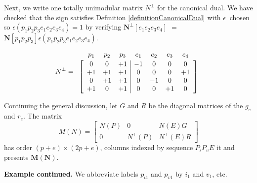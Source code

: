 \documentclass[12pt]{article}
\theoremstyle{definition}
\newcommand{\epsilonfun}{\ensuremath{\epsilon}}
\newcommand{\Is}{\ensuremath{\iota}}
\newcommand{\Vs}{\ensuremath{\upsilon}}
\newcommand{\ext}[1]{\ensuremath{\mathbf{#1}}}
\begin{document}
Next, we write one totally unimodular 
matrix $N^\perp$ for the canonical
dual.  We have checked that the sign satisfies Definition 
\ref{definitionCanonicalDual} with
$\epsilonfun\ $ chosen so $\epsilon(p_1p_2p_3e_1e_2e_3e_4)=1$
by verifying 
$\ext{N}^\perp[e_1e_2e_3e_4]$ 
$=$
$\ext{N}[p_1p_2p_3]\epsilon(p_1p_2p_3e_1e_2e_3e_4)$.



\[
N^\perp=
\begin{array}{c}
\begin{array}{ccccccc}
p_1 & p_2 & p_3 & e_1 & e_2 & e_3 & e_4 \\[-1em]
\hphantom{+1} & \hphantom{+1} &\hphantom{+1} &\hphantom{+1} &\hphantom{+1} &\hphantom{+1} &\hphantom{+1} 
\end{array} \\ 
\left[\begin{array}{ccc|cccc}
  0 &  0  &  +1 &  -1 &   0 &  0  & 0 \\
 +1 &  +1 &  +1 &   0 &   0 &  0  & +1\\
  0 &  +1 &  +1 &   0 &  -1 &  0  &  0\\
 +1 &   0 &  +1 &   0 &   0 & +1  &  0
	\end{array}\right]
  \end{array}
\]

Continuing the general discussion, let 
$G$ and $R$ be the diagonal matrices of the $g_e$ and $r_e$.
The matrix
\begin{equation}
\label{matrixM}
M(N)
=
\left[
	\begin{array}{ccc}
		N(P) & 0 & N(E)G \\
		0    & N^{\perp}(P) & N^{\perp}(E)R
	\end{array}
  \right]
\end{equation}
has order $(p+e)\times(2p+e)$, columns indexed by sequence
$P_{\Is}P_{\Vs}E$ it and presents $\ext{M}(\ext{N})$.

\textbf{Example continued.}
We abbreviate labels $p_{\Is 1}$ and $p_{\Vs 1}$ by $i_1$ and $v_1$, etc.
\end{document}
